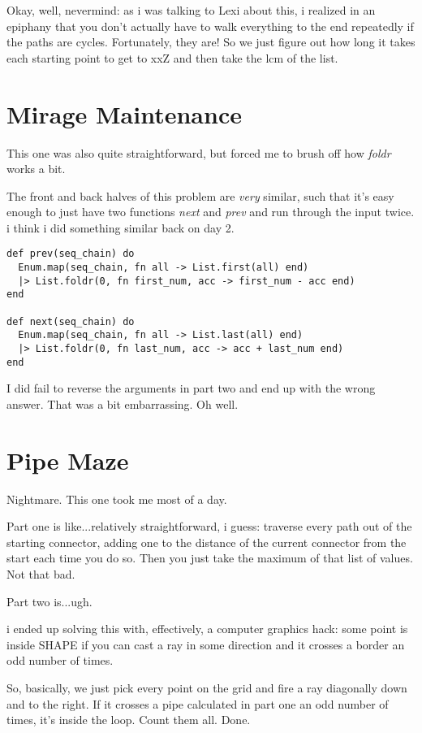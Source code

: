\documentclass{article}
\begin{document}
Okay, well, nevermind: as i was talking to Lexi about this, i realized in an epiphany that you don't actually have to walk everything to the end repeatedly if the paths are cycles. Fortunately, they are! So we just figure out how long it takes each starting point to get to xxZ and then take the lcm of the list.

\section{Mirage Maintenance}

This one was also quite straightforward, but forced me to brush off how \textit{foldr} works a bit.

The front and back halves of this problem are \textit{very} similar, such that it's easy enough to just have two functions \textit{next} and \textit{prev} and run through the input twice. i think i did something similar back on day 2.

\begin{verbatim}
def prev(seq_chain) do
  Enum.map(seq_chain, fn all -> List.first(all) end)
  |> List.foldr(0, fn first_num, acc -> first_num - acc end)
end

def next(seq_chain) do
  Enum.map(seq_chain, fn all -> List.last(all) end)
  |> List.foldr(0, fn last_num, acc -> acc + last_num end)
end
\end{verbatim}

I did fail to reverse the arguments in part two and end up with the wrong answer. That was a bit embarrassing. Oh well.

\section{Pipe Maze}

Nightmare. This one took me most of a day.

Part one is like...relatively straightforward, i guess: traverse every path out of the starting connector, adding one to the distance of the current connector from the start each time you do so. Then you just take the maximum of that list of values. Not that bad.

Part two is...ugh.

i ended up solving this with, effectively, a computer graphics hack: some point is inside SHAPE if you can cast a ray in some direction and it crosses a border an odd number of times.

So, basically, we just pick every point on the grid and fire a ray diagonally down and to the right. If it crosses a pipe calculated in part one an odd number of times, it's inside the loop. Count them all. Done.
\end{document}
